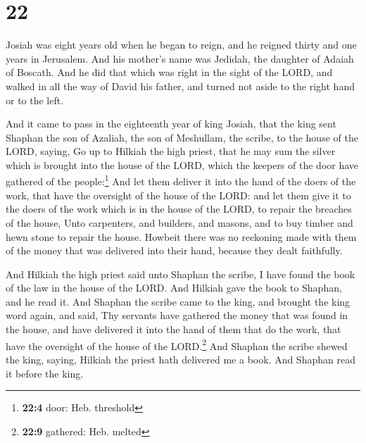 \hypertarget{section-21}{%
\section{22}\label{section-21}}

 Josiah was eight years old when he began to reign, and he
reigned thirty and one years in Jerusalem. And his mother's name was
Jedidah, the daughter of Adaiah of Boscath.  And he did
that which was right in the sight of the LORD, and walked in all the way
of David his father, and turned not aside to the right hand or to the
left.

 And it came to pass in the eighteenth year of king
Josiah, that the king sent Shaphan the son of Azaliah, the son of
Meshullam, the scribe, to the house of the LORD, saying, 
Go up to Hilkiah the high priest, that he may sum the silver which is
brought into the house of the LORD, which the keepers of the door have
gathered of the people:\footnote{\textbf{22:4} door: Heb. threshold}
 And let them deliver it into the hand of the doers of the
work, that have the oversight of the house of the LORD: and let them
give it to the doers of the work which is in the house of the LORD, to
repair the breaches of the house,  Unto carpenters, and
builders, and masons, and to buy timber and hewn stone to repair the
house.  Howbeit there was no reckoning made with them of
the money that was delivered into their hand, because they dealt
faithfully.

 And Hilkiah the high priest said unto Shaphan the scribe,
I have found the book of the law in the house of the LORD. And Hilkiah
gave the book to Shaphan, and he read it.  And Shaphan the
scribe came to the king, and brought the king word again, and said, Thy
servants have gathered the money that was found in the house, and have
delivered it into the hand of them that do the work, that have the
oversight of the house of the LORD.\footnote{\textbf{22:9} gathered:
  Heb. melted}  And Shaphan the scribe shewed the king,
saying, Hilkiah the priest hath delivered me a book. And Shaphan read it
before the king.


